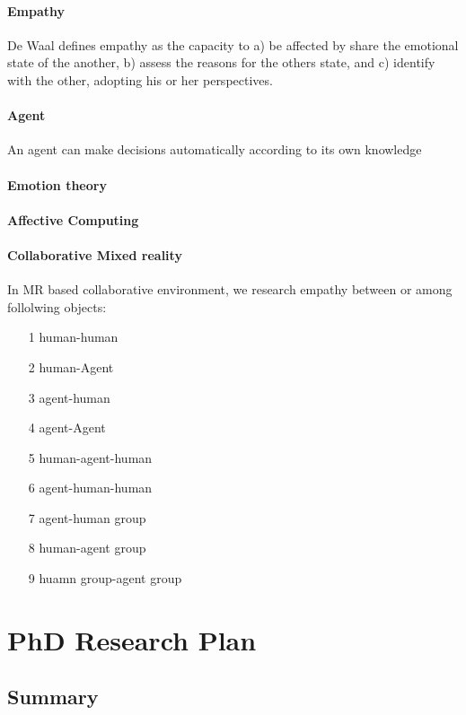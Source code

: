 \documentclass{article}
\begin{document}
\paragraph{Empathy}
De Waal\cite{preston2002empathy} defines empathy as the capacity to a) be affected by share the emotional
 state of the another, b) assess the reasons for the others state, and 
 c) identify with the other, adopting his or her perspectives.


\paragraph{Agent}
An agent can make decisions automatically according to its own knowledge
\paragraph{Emotion theory}

\paragraph{Affective Computing}

\paragraph{Collaborative Mixed reality}




In MR based collaborative environment, we research empathy between or among 
follolwing objects:
\begin{enumerate}
\item[1] human-human
\item[2] human-Agent
\item[3] agent-human
\item[4] agent-Agent
\item[5] human-agent-human
\item[6] agent-human-human
\item[7] agent-human group
\item[8] human-agent group
\item[9] huamn group-agent group     
\end{enumerate}

\section{PhD Research Plan}
\subsection{Summary}
\end{document}
